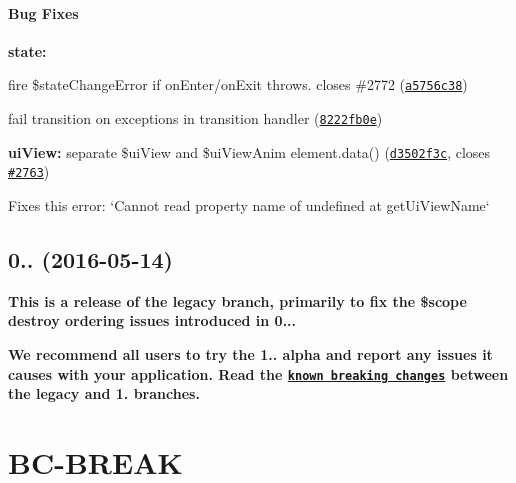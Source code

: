 {\bfseries {\bfseries \paragraph*{Bug Fixes}}}

{\bfseries {\bfseries }}

{\bfseries {\bfseries 
\begin{DoxyItemize}
\item {\bfseries state\+:}
\begin{DoxyItemize}
\item fire \$state\+Change\+Error if on\+Enter/on\+Exit throws. closes \#2772 (\href{https://github.com/angular-ui/ui-router/commit/a5756c38a282bd2556ed5faaf870d6e493722d1b}{\tt a5756c38})
\item fail transition on exceptions in transition handler (\href{https://github.com/angular-ui/ui-router/commit/8222fb0e7fd5eaaf6382f36db9ee9077a7bdbc6d}{\tt 8222fb0e})
\end{DoxyItemize}
\item {\bfseries ui\+View\+:} separate \$ui\+View and \$ui\+View\+Anim element.\+data() (\href{https://github.com/angular-ui/ui-router/commit/d3502f3c0cb6a63f4b80aac91428f748b6460396}{\tt d3502f3c}, closes \href{https://github.com/angular-ui/ui-router/issues/2763}{\tt \#2763})
\begin{DoxyItemize}
\item Fixes this error\+: `\+Cannot read property \textquotesingle{}name\textquotesingle{} of undefined at get\+Ui\+View\+Name`
\end{DoxyItemize}
\end{DoxyItemize}}}

{\bfseries {\bfseries \label{_0.3.0}%
 \subsection*{0.. (2016-\/05-\/14)}}}

{\bfseries {\bfseries }}

{\bfseries {\bfseries This is a release of the {\ttfamily legacy} branch, primarily to fix the \$scope destroy ordering issues introduced in 0...}}

{\bfseries {\bfseries We recommend all users to try the 1.. alpha and report any issues it causes with your application. Read the \href{https://github.com/angular-ui/ui-router/issues/2219}{\tt known breaking changes} between the legacy and 1. branches.}}

{\bfseries {\bfseries \section*{B\+C-\/\+B\+R\+E\+AK}}}

